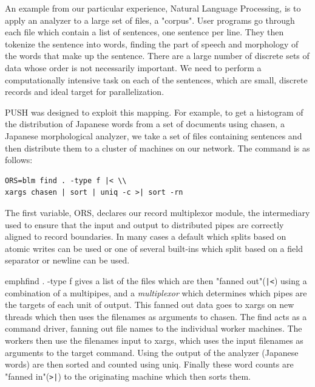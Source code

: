 An example from our particular experience, Natural Language Processing, is
to apply an analyzer to a large set of files, a "corpus". User programs go
through each file which contain a list of sentences, one sentence per line.
They then tokenize the sentence into words, finding the part of speech and
morphology of the words that make up the sentence.
There are a large number of discrete sets of data whose order is not 
necessarily important. We need to perform a computationally intensive task 
on each of the sentences, which are small, discrete records and ideal target 
for parallelization.

PUSH was designed to exploit this mapping. For example, to get a histogram of
the distribution of Japanese words from a set of documents using chasen,
a Japanese morphological analyzer, we take a set of files containing sentences
and then distribute them to a cluster of machines on our network. The command
is as follows:
%
%
\begin{verbatim}
ORS=blm find . -type f |< \\
xargs chasen | sort | uniq -c >| sort -rn
\end{verbatim}

The first variable, ORS, declares our record multiplexor module, 
the intermediary used to ensure that the input and output to 
distributed pipes are correctly aligned to record boundaries. 
In many cases a default which splits based on atomic writes can
be used or one of several built-ins which split based on a field
separator or newline can be used.

emph{find . -type f} gives a list of the files
which are then "fanned out"(\verb!|<!) using a combination
of a multipipes, and a \emph{multiplexor}
which determines which pipes are the targets of each unit of output.
This fanned out data goes to xargs on new threads
which then uses the filenames as arguments to
chasen. The find acts as a command driver, fanning out file names to the
individual worker machines. The workers then use the filenames input to
xargs, which uses the input filenames as arguments to the target command.
Using the output of the analyzer (Japanese words) are then sorted and 
counted using uniq.  Finally these word counts are "fanned in"(\verb!>|!) 
to the originating machine which then sorts them.

